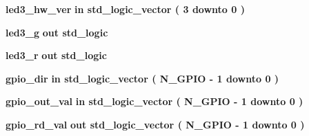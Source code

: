 \begin{DoxyCompactItemize}
\item 
{\bf led3\+\_\+hw\+\_\+ver}  {\bfseries {\bfseries \textcolor{keywordflow}{in}\textcolor{vhdlchar}{ }}} {\bfseries \textcolor{comment}{std\+\_\+logic\+\_\+vector}\textcolor{vhdlchar}{ }\textcolor{vhdlchar}{(}\textcolor{vhdlchar}{ }\textcolor{vhdlchar}{ } \textcolor{vhdldigit}{3} \textcolor{vhdlchar}{ }\textcolor{keywordflow}{downto}\textcolor{vhdlchar}{ }\textcolor{vhdlchar}{ } \textcolor{vhdldigit}{0} \textcolor{vhdlchar}{ }\textcolor{vhdlchar}{)}\textcolor{vhdlchar}{ }} 
\item 
{\bf led3\+\_\+g}  {\bfseries {\bfseries \textcolor{keywordflow}{out}\textcolor{vhdlchar}{ }}} {\bfseries \textcolor{comment}{std\+\_\+logic}\textcolor{vhdlchar}{ }} 
\item 
{\bf led3\+\_\+r}  {\bfseries {\bfseries \textcolor{keywordflow}{out}\textcolor{vhdlchar}{ }}} {\bfseries \textcolor{comment}{std\+\_\+logic}\textcolor{vhdlchar}{ }} 
\item 
{\bf gpio\+\_\+dir}  {\bfseries {\bfseries \textcolor{keywordflow}{in}\textcolor{vhdlchar}{ }}} {\bfseries \textcolor{comment}{std\+\_\+logic\+\_\+vector}\textcolor{vhdlchar}{ }\textcolor{vhdlchar}{(}\textcolor{vhdlchar}{ }\textcolor{vhdlchar}{ }\textcolor{vhdlchar}{ }\textcolor{vhdlchar}{ }{\bfseries {\bf N\+\_\+\+G\+P\+IO}} \textcolor{vhdlchar}{-\/}\textcolor{vhdlchar}{ } \textcolor{vhdldigit}{1} \textcolor{vhdlchar}{ }\textcolor{keywordflow}{downto}\textcolor{vhdlchar}{ }\textcolor{vhdlchar}{ } \textcolor{vhdldigit}{0} \textcolor{vhdlchar}{ }\textcolor{vhdlchar}{)}\textcolor{vhdlchar}{ }} 
\item 
{\bf gpio\+\_\+out\+\_\+val}  {\bfseries {\bfseries \textcolor{keywordflow}{in}\textcolor{vhdlchar}{ }}} {\bfseries \textcolor{comment}{std\+\_\+logic\+\_\+vector}\textcolor{vhdlchar}{ }\textcolor{vhdlchar}{(}\textcolor{vhdlchar}{ }\textcolor{vhdlchar}{ }\textcolor{vhdlchar}{ }\textcolor{vhdlchar}{ }{\bfseries {\bf N\+\_\+\+G\+P\+IO}} \textcolor{vhdlchar}{-\/}\textcolor{vhdlchar}{ } \textcolor{vhdldigit}{1} \textcolor{vhdlchar}{ }\textcolor{keywordflow}{downto}\textcolor{vhdlchar}{ }\textcolor{vhdlchar}{ } \textcolor{vhdldigit}{0} \textcolor{vhdlchar}{ }\textcolor{vhdlchar}{)}\textcolor{vhdlchar}{ }} 
\item 
{\bf gpio\+\_\+rd\+\_\+val}  {\bfseries {\bfseries \textcolor{keywordflow}{out}\textcolor{vhdlchar}{ }}} {\bfseries \textcolor{comment}{std\+\_\+logic\+\_\+vector}\textcolor{vhdlchar}{ }\textcolor{vhdlchar}{(}\textcolor{vhdlchar}{ }\textcolor{vhdlchar}{ }\textcolor{vhdlchar}{ }\textcolor{vhdlchar}{ }{\bfseries {\bf N\+\_\+\+G\+P\+IO}} \textcolor{vhdlchar}{-\/}\textcolor{vhdlchar}{ } \textcolor{vhdldigit}{1} \textcolor{vhdlchar}{ }\textcolor{keywordflow}{downto}\textcolor{vhdlchar}{ }\textcolor{vhdlchar}{ } \textcolor{vhdldigit}{0} \textcolor{vhdlchar}{ }\textcolor{vhdlchar}{)}\textcolor{vhdlchar}{ }} 

\end{DoxyCompactItemize}
